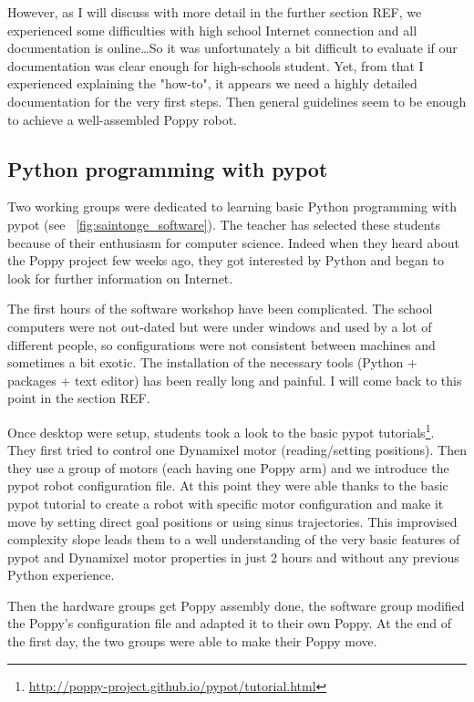 However, as I will discuss with more detail in the further section REF, we experienced some difficulties with high school Internet connection and all documentation is online\dots So it was unfortunately a bit difficult to evaluate if our documentation was clear enough for high-schools student. Yet, from that I experienced explaining the "how-to", it appears we need a highly detailed documentation for the very first steps. Then general guidelines seem to be enough to achieve a well-assembled Poppy robot.



\subsection{Python programming with pypot}

Two working groups were dedicated to learning basic Python programming with pypot (see \figurename~\ref{fig:saintonge_software}). The teacher has selected these students because of their enthusiasm for computer science. Indeed when they heard about the Poppy project few weeks ago, they got interested by Python and began to look for further information on Internet.

The first hours of the software workshop have been complicated. The school computers were not out-dated but were under windows and used by a lot of different people, so configurations were not consistent between machines and sometimes a bit exotic. The installation of the necessary tools (Python + packages + text editor) has been really long and painful. I will come back to this point in the section REF.

Once desktop were setup, students took a look to the basic pypot tutorials\footnote{\url{http://poppy-project.github.io/pypot/tutorial.html}}. They first tried to control one Dynamixel motor (reading/setting positions). Then they use a group of motors (each having one Poppy arm) and we introduce the pypot robot configuration file. At this point they were able thanks to the basic pypot tutorial to create a robot with specific motor configuration and make it move by setting direct goal positions or using sinus trajectories. This improvised complexity slope leads them to a well understanding of the very basic features of pypot and Dynamixel motor properties in just 2 hours and without any previous Python experience.

Then the hardware groups get Poppy assembly done, the software group modified the Poppy's configuration file and adapted it to their own Poppy. At the end of the first day, the two groups were able to make their Poppy move.


